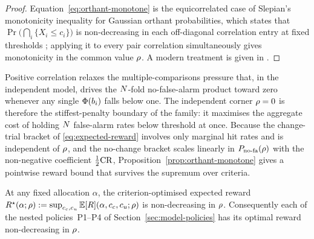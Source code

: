 \begin{proof}
Equation~\eqref{eq:orthant-monotone} is the equicorrelated case of
Slepian's monotonicity inequality for Gaussian orthant probabilities,
which states that $\Pr\!\big(\bigcap_i \{X_i \le c_i\}\big)$ is
non-decreasing in each off-diagonal correlation entry at fixed
thresholds \cite{Slepian1962}; applying it to every pair correlation
simultaneously gives monotonicity in the common value $\rho$. A modern
treatment is given in \cite{Tong1990}.
\end{proof}

Positive correlation relaxes the multiple-comparisons pressure that, in
the independent model, drives the $N$-fold no-false-alarm product
toward zero whenever any single $\Phi(b_i)$ falls below one. The
independent corner $\rho = 0$ is therefore the stiffest-penalty
boundary of the family: it maximises the aggregate cost of holding
$N$ false-alarm rates below threshold at once. Because the
change-trial bracket of \eqref{eq:expected-reward} involves only
marginal hit rates and is independent of $\rho$, and the no-change
bracket scales linearly in $P_{\mathrm{no\text{-}fa}}(\rho)$ with the non-negative
coefficient $\tfrac{1}{2}\mathrm{CR}$, Proposition~\ref{prop:orthant-monotone}
gives a pointwise reward bound that survives the supremum over criteria.

\begin{corollary}
\label{cor:policy-monotone}
At any fixed allocation $\alpha$, the criterion-optimised expected reward
$R^\star(\alpha; \rho) := \sup_{c_c, c_u}
\mathbb{E}[R](\alpha, c_c, c_u; \rho)$ is non-decreasing in $\rho$.
Consequently each of the nested policies~P1--P4 of
Section~\ref{sec:model-policies} has its optimal reward non-decreasing
in $\rho$.
\end{corollary}

